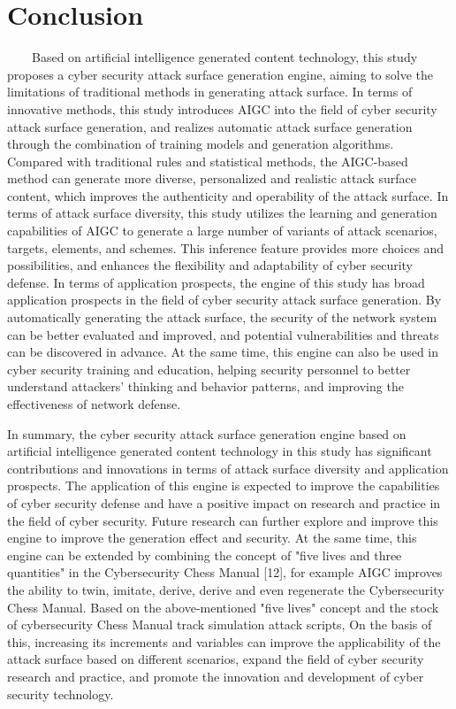 \documentclass[runningheads]{llncs}
\begin{document}
\section{Conclusion}
\ \ \ \ Based on artificial intelligence generated content technology, this study proposes a cyber security attack surface generation engine, aiming to solve the limitations of traditional methods in generating attack surface. In terms of innovative methods, this study introduces AIGC into the field of cyber security attack surface generation, and realizes automatic attack surface generation through the combination of training models and generation algorithms. Compared with traditional rules and statistical methods, the AIGC-based method can generate more diverse, personalized and realistic attack surface content, which improves the authenticity and operability of the attack surface. In terms of attack surface diversity, this study utilizes the learning and generation capabilities of AIGC to generate a large number of variants of attack scenarios, targets, elements, and schemes. This inference feature provides more choices and possibilities, and enhances the flexibility and adaptability of cyber security defense. In terms of application prospects, the engine of this study has broad application prospects in the field of cyber security attack surface generation. By automatically generating the attack surface, the security of the network system can be better evaluated and improved, and potential vulnerabilities and threats can be discovered in advance. At the same time, this engine can also be used in cyber security training and education, helping security personnel to better understand attackers' thinking and behavior patterns, and improving the effectiveness of network defense.\par
%
In summary, the cyber security attack surface generation engine based on artificial intelligence generated content technology in this study has significant contributions and innovations in terms of attack surface diversity and application prospects. The application of this engine is expected to improve the capabilities of cyber security defense and have a positive impact on research and practice in the field of cyber security. Future research can further explore and improve this engine to improve the generation effect and security. At the same time, this engine can be extended by combining the concept of "five lives and three quantities" in the Cybersecurity Chess Manual [12], for example AIGC improves the ability to twin, imitate, derive, derive and even regenerate the Cybersecurity Chess Manual. Based on the above-mentioned "five lives" concept and the stock of cybersecurity Chess Manual track simulation attack scripts, On the basis of this, increasing its increments and variables can improve the applicability of the attack surface based on different scenarios, expand the field of cyber security research and practice, and promote the innovation and development of cyber security technology.
\end{document}
